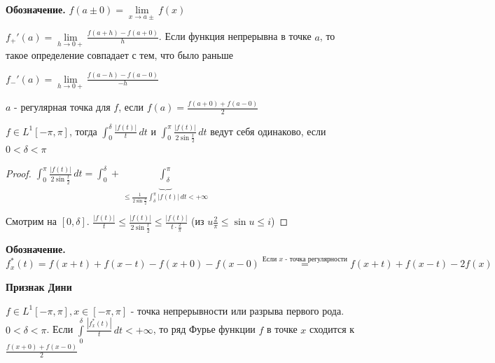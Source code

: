 \textbf{Обозначение. } $f(a \pm 0) = \lim\limits_{x \to a\pm} f(x)$

$f_+' (a) = \lim\limits_{h \to 0+} \frac{f(a + h) - f(a + 0)}{h}$. Если функция непрерывна в точке $a$, то такое определение совпадает с тем, что было раньше

$f_-' (a) = \lim\limits_{h \to 0+} \frac{f(a - h) - f(a - 0)}{-h}$

\begin{definition}
    $a$ - регулярная точка для $f$, если $f(a) = \frac{f(a + 0) + f(a - 0)}{2}$
\end{definition}

\begin{lemma}
    $f \in L^1 [-\pi, \pi]$, тогда $\int_0^\delta \frac{|f(t)|}{t} \, dt$ и $\int_0^\pi \frac{|f(t)|}{2\sin \frac{t}{2}} \, dt$ ведут себя одинаково, 
    если $0 < \delta < \pi$
\end{lemma}

\begin{proof}
    $\int_0^\pi \frac{|f(t)|}{2\sin \frac{t}{2}} \, dt = \int_0^\delta + \underbrace{\int_\delta^\pi}_{\leqslant \frac{1}{2\sin \frac{\delta}{2}} \int_\delta^\pi |f(t)| \, dt < +\infty } $

    Смотрим на $[0, \delta]$. $\frac{|f(t)|}{t} \leqslant \frac{|f(t)|}{2 \sin \frac{t}{2}} \leqslant \frac{|f(t)|}{t \cdot \frac{2}{\pi}}$ (из $u \frac{2}{\pi} \leqslant \sin u \leqslant i$)
\end{proof}

\textbf{Обозначение. }  $f_x^* (t) = f(x + t) + f(x - t) - f(x + 0) - f(x - 0) \overset{\text{Если $x$ - точка регулярности}}{=} f(x + t) + f(x - t) - 2f(x)$

\begin{theorem}
    \textbf{Признак Дини}

    $f \in L^{1} [-\pi, \pi], x \in [-\pi, \pi]$ - точка непрерывности или разрыва первого рода. $0 < \delta < \pi$. Если $\int\limits_0^\delta \frac{|f_x^* (t)|}{t} \, dt < +\infty$, то ряд Фурье 
    функции $f$ в точке $x$ сходится к $\frac{f(x + 0) + f(x - 0)}{2}$
\end{theorem}

